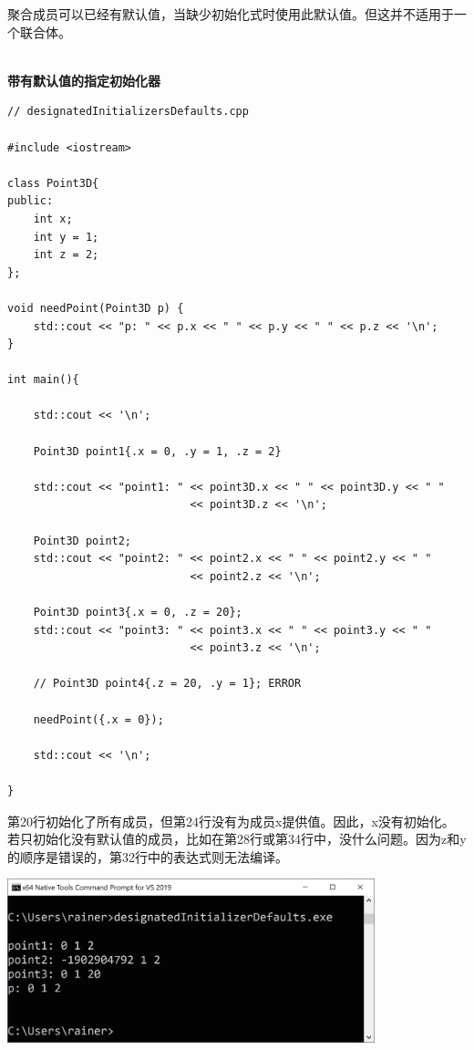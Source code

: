 聚合成员可以已经有默认值，当缺少初始化式时使用此默认值。但这并不适用于一个联合体。

\hspace*{\fill} \\ %
\noindent
\textbf{带有默认值的指定初始化器}
\begin{lstlisting}[style=styleCXX]
// designatedInitializersDefaults.cpp

#include <iostream>

class Point3D{
public:
	int x;
	int y = 1;
	int z = 2;
};

void needPoint(Point3D p) {
	std::cout << "p: " << p.x << " " << p.y << " " << p.z << '\n';
}

int main(){
	
	std::cout << '\n';
	
	Point3D point1{.x = 0, .y = 1, .z = 2}
	
	std::cout << "point1: " << point3D.x << " " << point3D.y << " "
							<< point3D.z << '\n';
							 
	Point3D point2;		 
	std::cout << "point2: " << point2.x << " " << point2.y << " "
							<< point2.z << '\n';
				
    Point3D point3{.x = 0, .z = 20};			 
	std::cout << "point3: " << point3.x << " " << point3.y << " "
							<< point3.z << '\n';
	
	// Point3D point4{.z = 20, .y = 1}; ERROR
	
	needPoint({.x = 0});
	
	std::cout << '\n';
	
}
\end{lstlisting}

第20行初始化了所有成员，但第24行没有为成员x提供值。因此，x没有初始化。若只初始化没有默认值的成员，比如在第28行或第34行中，没什么问题。因为z和y的顺序是错误的，第32行中的表达式则无法编译。

\begin{center}
\includegraphics[width=0.8\textwidth]{content/3/chapter4/images/34.png}\\
\end{center}

